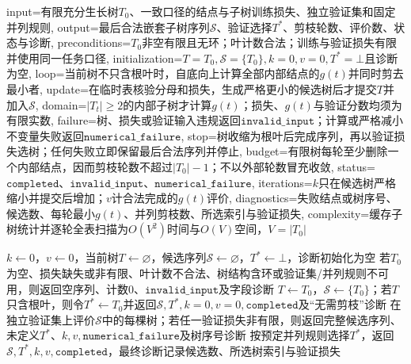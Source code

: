 \begin{AlgorithmContract}{
  input={有限充分生长树$T_0$、一致口径的结点与子树训练损失、独立验证集和固定并列规则},
  output={最后合法嵌套子树序列$\mathcal S$、验证选择$T^*$、剪枝轮数、评价数、状态与诊断},
  preconditions={$T_0$非空有限且无环；叶计数合法；训练与验证损失有限并使用同一任务口径},
  initialization={$T=T_0,\mathcal S=\{T_0\},k=0,v=0,T^*=\bot$且诊断为空},
  loop={当前树不只含根叶时，自底向上计算全部内部结点的$g(t)$并同时剪去最小者},
  update={在临时表核验分母和损失，生成严格更小的候选树后才提交$T$并加入$\mathcal S$},
  domain={$|T_t|\ge2$的内部子树才计算$g(t)$；损失、$g(t)$与验证分数均须为有限实数},
  failure={树、损失或验证输入违规返回$\mathtt{invalid\_input}$；计算或严格减小不变量失败返回$\mathtt{numerical\_failure}$},
  stop={树收缩为根叶后完成序列，再以验证损失选树；任何失败立即保留最后合法序列并停止},
  budget={有限树每轮至少删除一个内部结点，因而剪枝轮数不超过$|T_0|-1$；不以外部轮数冒充收敛},
  status={$\mathtt{completed}$、$\mathtt{invalid\_input}$、$\mathtt{numerical\_failure}$},
  iterations={$k$只在候选树严格缩小并提交后增加；$v$计合法完成的$g(t)$评价},
  diagnostics={失败结点或树序号、候选数、每轮最小$g(t)$、并列剪枝数、所选索引与验证损失},
  complexity={缓存子树统计并逐轮全表扫描为$O(V^2)$时间与$O(V)$空间，$V=|T_0|$}
}
\begin{algorithm}[H]
\caption{CART最弱环节剪枝}\label{alg:V2-C04-cart-prune}
$k\leftarrow0$，$v\leftarrow0$，当前树$T\leftarrow\varnothing$，候选序列$\mathcal S\leftarrow\varnothing$，$T^*\leftarrow\bot$，诊断初始化为空\;
若$T_0$为空、损失缺失或非有限、叶计数不合法、树结构含环或验证集/并列规则不可用，则返回空序列、计数$0$、$\mathtt{invalid\_input}$及字段诊断\;
$T\leftarrow T_0$，$\mathcal S\leftarrow\{T_0\}$；若$T$只含根叶，则令$T^*\leftarrow T_0$并返回$\mathcal S,T^*,k=0,v=0,\mathtt{completed}$及“无需剪枝”诊断\;
在独立验证集上评价$\mathcal S$中的每棵树；若任一验证损失非有限，则返回完整候选序列、未定义$T^*$、$k,v,\mathtt{numerical\_failure}$及树序号诊断\;
按预定并列规则选择$T^*$，返回$\mathcal S,T^*,k,v,\mathtt{completed}$，最终诊断记录候选数、所选树索引与验证损失\;
\end{algorithm}
\end{AlgorithmContract}

